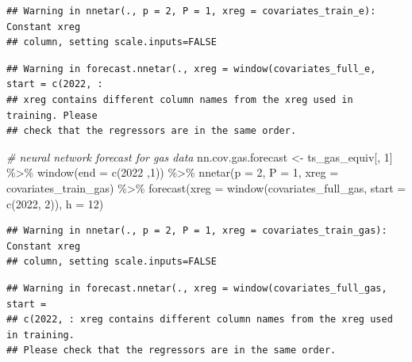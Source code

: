 \documentclass[
]{article}
\newenvironment{Shaded}{\begin{snugshade}}{\end{snugshade}}
\newcommand{\AttributeTok}[1]{\textcolor[rgb]{0.77,0.63,0.00}{#1}}
\newcommand{\CommentTok}[1]{\textcolor[rgb]{0.56,0.35,0.01}{\textit{#1}}}
\newcommand{\DecValTok}[1]{\textcolor[rgb]{0.00,0.00,0.81}{#1}}
\newcommand{\FunctionTok}[1]{\textcolor[rgb]{0.00,0.00,0.00}{#1}}
\newcommand{\NormalTok}[1]{#1}
\newcommand{\OtherTok}[1]{\textcolor[rgb]{0.56,0.35,0.01}{#1}}
\newcommand{\SpecialCharTok}[1]{\textcolor[rgb]{0.00,0.00,0.00}{#1}}
\newcommand{\StringTok}[1]{\textcolor[rgb]{0.31,0.60,0.02}{#1}}
\begin{document}
\begin{verbatim}
## Warning in nnetar(., p = 2, P = 1, xreg = covariates_train_e): Constant xreg
## column, setting scale.inputs=FALSE
\end{verbatim}

\begin{verbatim}
## Warning in forecast.nnetar(., xreg = window(covariates_full_e, start = c(2022, :
## xreg contains different column names from the xreg used in training. Please
## check that the regressors are in the same order.
\end{verbatim}

\begin{Shaded}
\begin{Highlighting}[]
\CommentTok{\# neural network forecast for gas data}
\NormalTok{nn.cov.gas.forecast }\OtherTok{\textless{}{-}}\NormalTok{ ts\_gas\_equiv[, }\DecValTok{1}\NormalTok{] }\SpecialCharTok{\%\textgreater{}\%} 
  \FunctionTok{window}\NormalTok{(}\AttributeTok{end =} \FunctionTok{c}\NormalTok{(}\DecValTok{2022}\NormalTok{ ,}\DecValTok{1}\NormalTok{)) }\SpecialCharTok{\%\textgreater{}\%} 
  \FunctionTok{nnetar}\NormalTok{(}\AttributeTok{p =} \DecValTok{2}\NormalTok{, }\AttributeTok{P =} \DecValTok{1}\NormalTok{,}
         \AttributeTok{xreg =}\NormalTok{ covariates\_train\_gas) }\SpecialCharTok{\%\textgreater{}\%} 
  \FunctionTok{forecast}\NormalTok{(}\AttributeTok{xreg =} \FunctionTok{window}\NormalTok{(covariates\_full\_gas, }\AttributeTok{start =} \FunctionTok{c}\NormalTok{(}\DecValTok{2022}\NormalTok{, }\DecValTok{2}\NormalTok{)),}
           \AttributeTok{h =} \DecValTok{12}\NormalTok{)}
\end{Highlighting}
\end{Shaded}

\begin{verbatim}
## Warning in nnetar(., p = 2, P = 1, xreg = covariates_train_gas): Constant xreg
## column, setting scale.inputs=FALSE
\end{verbatim}

\begin{verbatim}
## Warning in forecast.nnetar(., xreg = window(covariates_full_gas, start =
## c(2022, : xreg contains different column names from the xreg used in training.
## Please check that the regressors are in the same order.
\end{verbatim}

\begin{Shaded}
\end{Shaded}
\end{document}
